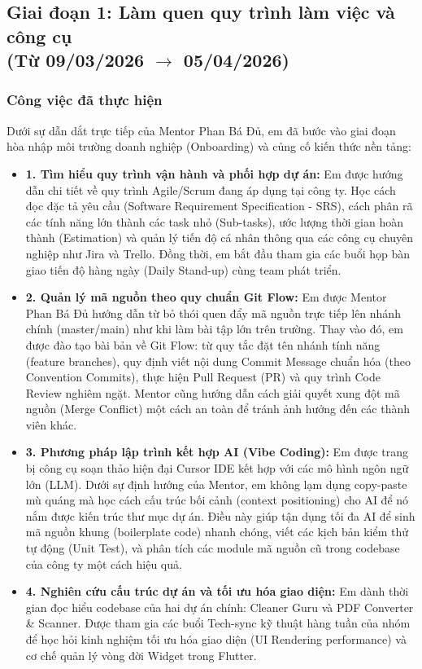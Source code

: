 \documentclass[12pt, a4paper]{article}
\begin{document}
\subsection[Giai đoạn 1: Làm quen quy trình làm việc và công cụ (Từ 09/03/2026 đến 05/04/2026)]{Giai đoạn 1: Làm quen quy trình làm việc và công cụ \\(Từ 09/03/2026 $\rightarrow$ 05/04/2026)}
\subsubsection{Công việc đã thực hiện}
Dưới sự dẫn dắt trực tiếp của Mentor Phan Bá Đủ, em đã bước vào giai đoạn hòa nhập môi trường doanh nghiệp (Onboarding) và củng cố kiến thức nền tảng:
\begin{itemize}
    \item \textbf{1. Tìm hiểu quy trình vận hành và phối hợp dự án:}
    Em được hướng dẫn chi tiết về quy trình Agile/Scrum đang áp dụng tại công ty. Học cách đọc đặc tả yêu cầu (Software Requirement Specification - SRS), cách phân rã các tính năng lớn thành các task nhỏ (Sub-tasks), ước lượng thời gian hoàn thành (Estimation) và quản lý tiến độ cá nhân thông qua các công cụ chuyên nghiệp như Jira và Trello. Đồng thời, em bắt đầu tham gia các buổi họp bàn giao tiến độ hàng ngày (Daily Stand-up) cùng team phát triển.
    
    \item \textbf{2. Quản lý mã nguồn theo quy chuẩn Git Flow:}
    Em được Mentor Phan Bá Đủ hướng dẫn từ bỏ thói quen đẩy mã nguồn trực tiếp lên nhánh chính (master/main) như khi làm bài tập lớn trên trường. Thay vào đó, em được đào tạo bài bản về Git Flow: từ quy tắc đặt tên nhánh tính năng (feature branches), quy định viết nội dung Commit Message chuẩn hóa (theo Convention Commits), thực hiện Pull Request (PR) và quy trình Code Review nghiêm ngặt. Mentor cũng hướng dẫn cách giải quyết xung đột mã nguồn (Merge Conflict) một cách an toàn để tránh ảnh hưởng đến các thành viên khác.
    
    \item \textbf{3. Phương pháp lập trình kết hợp AI (Vibe Coding):}
    Em được trang bị công cụ soạn thảo hiện đại Cursor IDE kết hợp với các mô hình ngôn ngữ lớn (LLM). Dưới sự định hướng của Mentor, em không lạm dụng copy-paste mù quáng mà học cách cấu trúc bối cảnh (context positioning) cho AI để nó nắm được kiến trúc thư mục dự án. Điều này giúp tận dụng tối đa AI để sinh mã nguồn khung (boilerplate code) nhanh chóng, viết các kịch bản kiểm thử tự động (Unit Test), và phân tích các module mã nguồn cũ trong codebase của công ty một cách hiệu quả.
    
    \item \textbf{4. Nghiên cứu cấu trúc dự án và tối ưu hóa giao diện:}
    Em dành thời gian đọc hiểu codebase của hai dự án chính: Cleaner Guru và PDF Converter \& Scanner. Được tham gia các buổi Tech-sync kỹ thuật hàng tuần của nhóm để học hỏi kinh nghiệm tối ưu hóa giao diện (UI Rendering performance) và cơ chế quản lý vòng đời Widget trong Flutter.
\end{itemize}
\end{document}
